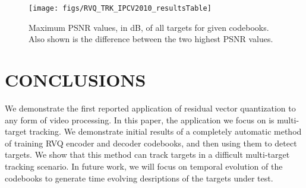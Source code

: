 \documentclass{article}
\begin{document}
\begin{figure}
		
	\texttt{[image: figs/RVQ\_TRK\_IPCV2010\_resultsTable]}
	\caption{Maximum PSNR values, in dB, of all targets for given codebooks.  Also shown is the difference between the two highest PSNR values. } 	
	\label{fig:Table}
	\end{figure}

\section{CONCLUSIONS}
We demonstrate the first reported application of residual vector quantization to any form of video processing.  In this paper, the application we focus on is multi-target tracking.  We demonstrate initial results of a completely automatic method of training RVQ encoder and decoder codebooks, and then using them to detect targets.  We show that this method can track targets in a difficult multi-target tracking scenario.  In future work, we will focus on temporal evolution of the codebooks to generate time evolving desriptions of the targets under test.



\end{document}
